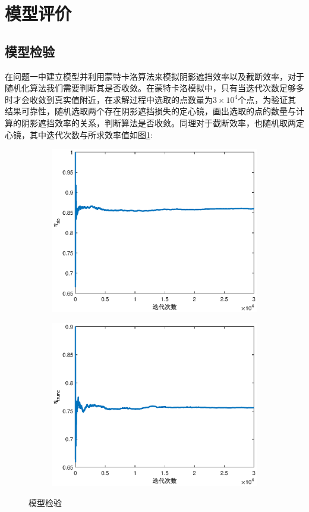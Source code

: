 \documentclass[withoutpreface,bwprint]{cumcmthesis} %
\begin{document}
\section{模型评价}
\subsection{模型检验}
在问题一中建立模型并利用蒙特卡洛算法来模拟阴影遮挡效率以及截断效率，对于随机化算法我们需要判断其是否收敛。在蒙特卡洛模拟中，只有当迭代次数足够多时才会收敛到真实值附近，在求解过程中选取的点数量为$3\times 10^4$个点，为验证其结果可靠性，随机选取两个存在阴影遮挡损失的定心镜，画出选取的点的数量与计算的阴影遮挡效率的关系，判断算法是否收敛。同理对于截断效率，也随机取两定心镜，其中迭代次数与所求效率值如图\ref{mxjy}:

\begin{figure}[H]
\centering
\begin{subfigure}[b]{.49\textwidth}
\includegraphics[width=\textwidth]{figures/遮挡模型检验.eps}
\end{subfigure}
\begin{subfigure}[b]{.49\textwidth}
\includegraphics[width=\textwidth]{figures/截断模型检验.eps}
\end{subfigure}
\caption{模型检验}\label{mxjy}
\end{figure}
\end{document}
